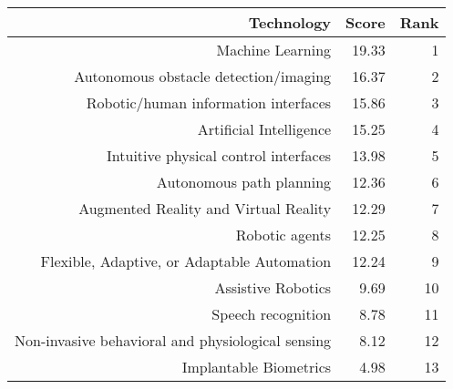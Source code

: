 \begin{tabular}{*{3}{r}}
    \toprule
    Technology                                        & Score & Rank \\
    \midrule
    Machine Learning                                  & 19.33 & 1    \\
    Autonomous obstacle detection/imaging             & 16.37 & 2    \\
    Robotic/human information interfaces              & 15.86 & 3    \\
    Artificial Intelligence                           & 15.25 & 4    \\
    Intuitive physical control interfaces             & 13.98 & 5    \\
    Autonomous path planning                          & 12.36 & 6    \\
    Augmented Reality and Virtual Reality             & 12.29 & 7    \\
    Robotic agents                                    & 12.25 & 8    \\
    Flexible, Adaptive, or Adaptable Automation       & 12.24 & 9    \\
    Assistive Robotics                                & 9.69  & 10   \\
    Speech recognition                                & 8.78  & 11   \\
    Non-invasive behavioral and physiological sensing & 8.12  & 12   \\
    Implantable Biometrics                            & 4.98  & 13   \\
    \bottomrule
\end{tabular}
